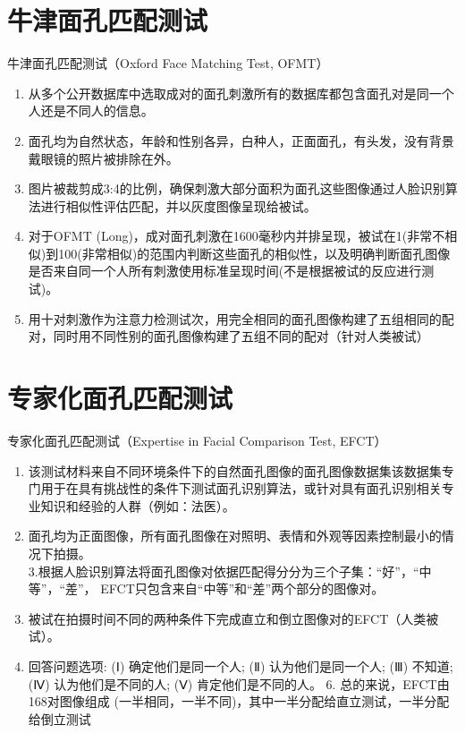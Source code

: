 \documentclass[]{ctexbook}
\providecommand{\tightlist}{%
  \setlength{\itemsep}{0pt}\setlength{\parskip}{0pt}}
\theoremstyle{definition}
\theoremstyle{definition}
\theoremstyle{definition}
\theoremstyle{definition}
\theoremstyle{remark}
\begin{document}
\section{牛津面孔匹配测试}\label{ux725bux6d25ux9762ux5b54ux5339ux914dux6d4bux8bd5}

牛津面孔匹配测试（Oxford Face Matching Test, OFMT）

\begin{enumerate}
\def\labelenumi{\arabic{enumi}.}
\tightlist
\item
  从多个公开数据库中选取成对的面孔刺激所有的数据库都包含面孔对是同一个人还是不同人的信息。\\
\item
  面孔均为自然状态，年龄和性别各异，白种人，正面面孔，有头发，没有背景戴眼镜的照片被排除在外。\\
\item
  图片被裁剪成3:4的比例，确保刺激大部分面积为面孔这些图像通过人脸识别算法进行相似性评估匹配，并以灰度图像呈现给被试。\\
\item
  对于OFMT (Long)，成对面孔刺激在1600毫秒内并排呈现，被试在1(非常不相似)到100(非常相似)的范围内判断这些面孔的相似性，以及明确判断面孔图像是否来自同一个人所有刺激使用标准呈现时间(不是根据被试的反应进行测试)。\\
\item
  用十对刺激作为注意力检测试次，用完全相同的面孔图像构建了五组相同的配对，同时用不同性别的面孔图像构建了五组不同的配对（针对人类被试）
\end{enumerate}

\section{专家化面孔匹配测试}\label{ux4e13ux5bb6ux5316ux9762ux5b54ux5339ux914dux6d4bux8bd5}

专家化面孔匹配测试（Expertise in Facial Comparison Test, EFCT）

\begin{enumerate}
\def\labelenumi{\arabic{enumi}.}
\tightlist
\item
  该测试材料来自不同环境条件下的自然面孔图像的面孔图像数据集该数据集专门用于在具有挑战性的条件下测试面孔识别算法，或针对具有面孔识别相关专业知识和经验的人群（例如：法医）。\\
\item
  面孔均为正面图像，所有面孔图像在对照明、表情和外观等因素控制最小的情况下拍摄。\\
  3.根据人脸识别算法将面孔图像对依据匹配得分分为三个子集：``好''，``中等''，``差''， EFCT只包含来自``中等''和``差''两个部分的图像对。\\
\item
  被试在拍摄时间不同的两种条件下完成直立和倒立图像对的EFCT（人类被试）。\\
\item
  回答问题选项: (Ⅰ) 确定他们是同一个人; (Ⅱ) 认为他们是同一个人; (Ⅲ) 不知道; (Ⅳ) 认为他们是不同的人; (Ⅴ) 肯定他们是不同的人。 6. 总的来说，EFCT由168对图像组成 (一半相同，一半不同)，其中一半分配给直立测试，一半分配给倒立测试
\end{enumerate}
\end{document}
